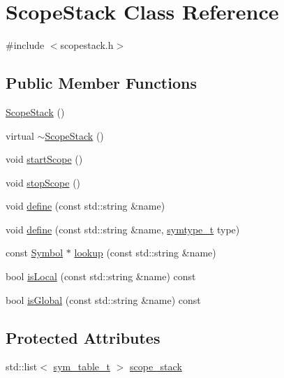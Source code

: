 \hypertarget{class_scope_stack}{\section{Scope\-Stack Class Reference}
\label{class_scope_stack}
}


{\ttfamily \#include $<$scopestack.\-h$>$}

\subsection*{Public Member Functions}
\begin{DoxyCompactItemize}
\item 
\hyperlink{class_scope_stack_a754459e71e5e91fd4210c063014634c2}{Scope\-Stack} ()
\item 
virtual \hyperlink{class_scope_stack_a64e2f6ee2758341a649bbbc873b4c626}{$\sim$\-Scope\-Stack} ()
\item 
void \hyperlink{class_scope_stack_ae5809bddef2aa253460c1d35ed36c1c8}{start\-Scope} ()
\item 
void \hyperlink{class_scope_stack_a410129444ad5a4be8784007d1fd73129}{stop\-Scope} ()
\item 
void \hyperlink{class_scope_stack_a16f903a19a7223c925d00fe6ba4155f2}{define} (const std\-::string \&name)
\item 
void \hyperlink{class_scope_stack_ae0c9aa708ebe375e6d4c4eebc4ffc60a}{define} (const std\-::string \&name, \hyperlink{symbol_8h_a07090a2a79cb68ad8d84e7ecd6558859}{symtype\-\_\-t} type)
\item 
const \hyperlink{class_symbol}{Symbol} $\ast$ \hyperlink{class_scope_stack_a93cb7113443905f602ba812587e01b4d}{lookup} (const std\-::string \&name)
\item 
bool \hyperlink{class_scope_stack_a553478b9e13cba1cf77b7f0e7a91c6f4}{is\-Local} (const std\-::string \&name) const 
\item 
bool \hyperlink{class_scope_stack_ae0792790e8cfd148e0cfb67090a790bf}{is\-Global} (const std\-::string \&name) const 
\end{DoxyCompactItemize}
\subsection*{Protected Attributes}
\begin{DoxyCompactItemize}
\item 
std\-::list$<$ \hyperlink{scopestack_8h_ac00f2f845911b84646322b4b1c7bc14c}{sym\-\_\-table\-\_\-t} $>$ \hyperlink{class_scope_stack_affa1115b1547064c04186846fd594344}{scope\-\_\-stack}
\end{DoxyCompactItemize}


